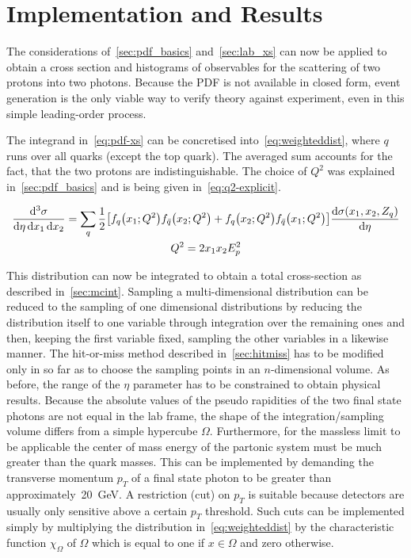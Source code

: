 
\section{Implementation and Results}%
\label{sec:pdf_results}

The considerations of~\ref{sec:pdf_basics} and~\ref{sec:lab_xs} can
now be applied to obtain a cross section and histograms of observables
for the scattering of two protons into two photons. Because the PDF is
not available in closed form, event generation is the only viable way
to verify theory against experiment, even in this simple leading-order
process.

The integrand in~\eqref{eq:pdf-xs} can be concretised
into~\eqref{eq:weighteddist}, where \(q\) runs over all quarks (except
the top quark). The averaged sum accounts for the fact, that the two
protons are indistinguishable. The choice of \(Q^2\) was explained
in~\ref{sec:pdf_basics} and is being given in~\eqref{eq:q2-explicit}.

\begin{gather}
  \label{eq:weighteddist}
  \frac{\dd[3]{\sigma}}{\dd{\eta}\dd{x_1}\dd{x_2}} =
  \sum_q \frac{1}{2}\qty[f_q\qty(x_1;Q^2) f_{\bar{q}}\qty(x_2;Q^2) + f_q\qty(x_2;Q^2) f_{\bar{q}}\qty(x_1;Q^2)] \dv{\sigma(x_1,
    x_2, Z_q)}{\eta} \\
  \label{eq:q2-explicit}
  Q^2 = 2x_1x_2E_p^2
\end{gather}

This distribution can now be integrated to obtain a total
cross-section as described in~\ref{sec:mcint}. Sampling a
multi-dimensional distribution can be reduced to the sampling of one
dimensional distributions by reducing the distribution itself to one
variable through integration over the remaining ones and then, keeping
the first variable fixed, sampling the other variables in a likewise
manner. The hit-or-miss method described in~\ref{sec:hitmiss} has to
be modified only in so far as to choose the sampling points in an
\(n\)-dimensional volume. As before, the range of the \(\eta\)
parameter has to be constrained to obtain physical results. Because
the absolute values of the pseudo rapidities of the two final state
photons are not equal in the lab frame, the shape of the
integration/sampling volume differs from a simple
hypercube \(\Omega\). Furthermore, for the massless limit to be applicable the
center of mass energy of the partonic system must be much greater than
the quark masses. This can be implemented by demanding the
transverse momentum \(p_T\) of a final state photon to be greater than
approximately~\SI{20}{\giga\electronvolt}. A restriction (cut) on
\(p_T\) is suitable because detectors are usually only sensitive above
a certain \(p_T\) threshold. %
Such cuts can be implemented simply by multiplying the distribution
in~\eqref{eq:weighteddist} by the characteristic function
\(\chi_\Omega\) of \(\Omega\) which is equal to one if \(x\in\Omega\)
and zero otherwise.

